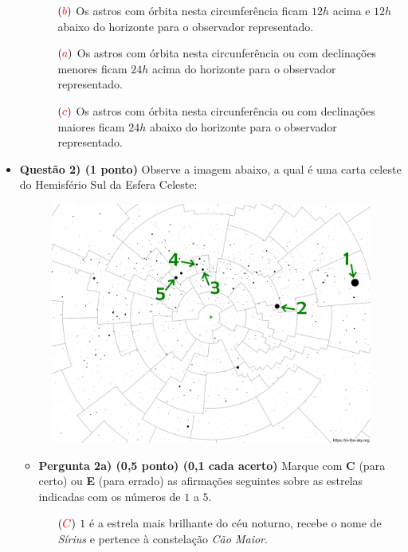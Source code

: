 \documentclass[a4paper, 12pt]{article}
\newcommand{\red}[1]{\textcolor{red}{#1}}
\begin{document}
\begin{flushleft}
\begin{itemize}
\begin{itemize}
{\begin{itemize}
					\end{itemize}}
					\begin{itemize}
						\item[$(\red{b})$] Os astros com órbita nesta circunferência ficam $12h$ acima e $12h$ abaixo do horizonte para o observador representado.
						\item[$(\red{a})$] Os astros com órbita nesta circunferência ou com declinações menores ficam $24h$ acima do horizonte para o observador representado.
						\item[$(\red{c})$] Os astros com órbita nesta circunferência ou com declinações maiores ficam $24h$ abaixo do horizonte para o observador representado.
					\end{itemize}
			\end{itemize}
			
				\item \textbf{Questão 2) (1 ponto)} Observe a imagem abaixo, a qual é uma carta celeste do Hemisfério Sul da Esfera Celeste:
			\begin{figure}[H]
				\centering
				\includegraphics[scale=0.5]{./img/2.png}
			\end{figure}
			\begin{itemize}
				\item \textbf{Pergunta 2a) (0,5 ponto) (0,1 cada acerto)} Marque com \textbf{C} (para certo) ou \textbf{E} (para errado) as afirmações seguintes sobre as estrelas indicadas com os números de $1$ a $5$.
					\begin{itemize}
						\item[$(\red{C})$] $1$ é a estrela mais brilhante do céu noturno, recebe o nome de \textit{Sírius} e pertence à constelação \textit{Cão Maior}.

\end{itemize}
\end{itemize}
\end{itemize}
\end{flushleft}
\end{document}

